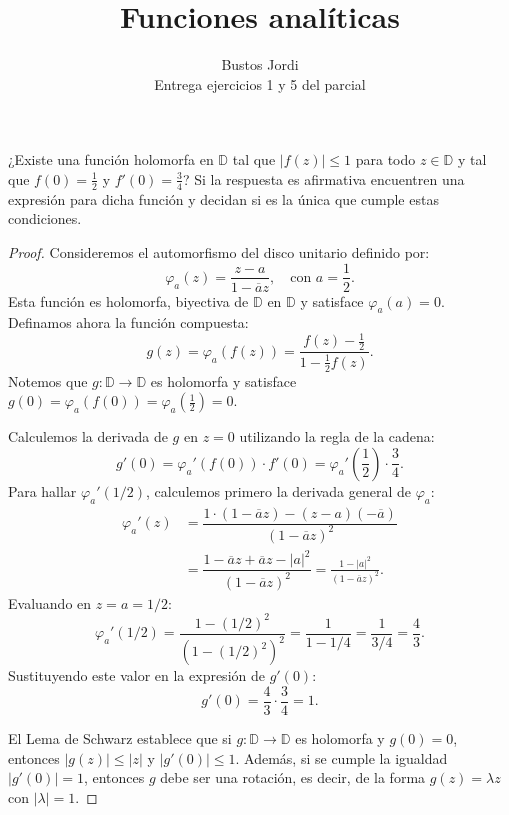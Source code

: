 \documentclass{article}
\newcommand{\D}{\mathbb{D}}
\newenvironment{theorem}[2][Ejercicio]{\begin{trivlist}
\item[\hskip\labelsep{\bfseries #1}\hskip\labelsep{\bfseries #2.}]}{\end{trivlist}}
\begin{document}
\title{Funciones analíticas}
\author{Bustos Jordi\\Entrega ejercicios 1 y 5 del parcial}

\maketitle

\begin{theorem}{1}
    ¿Existe una función holomorfa en \( \D \) tal que \( |f(z)| \leq 1 \) para todo \( z \in \D \) y tal que \( f(0) = \frac{1}{2} \) y
    \( f'(0) = \frac{3}{4} \)? Si la respuesta es afirmativa encuentren una expresión para dicha función y decidan si es la única que cumple estas condiciones.
\end{theorem}

\begin{proof}
    Consideremos el automorfismo del disco unitario definido por:
    \[
        \varphi_a(z) = \dfrac{z-a}{1 - \overline{a}z}, \quad \text{con } a = \frac{1}{2}.
    \]
    Esta función es holomorfa, biyectiva de \( \D \) en \( \D \) y satisface \( \varphi_a(a) = 0 \). Definamos ahora la función compuesta:
    \[
        g(z) = \varphi_a(f(z)) = \frac{f(z) - \frac{1}{2}}{1 - \frac{1}{2}f(z)}.
    \]
    Notemos que \( g : \D \to \D \) es holomorfa y satisface \( g(0) = \varphi_a(f(0)) = \varphi_a\left(\frac{1}{2}\right) = 0 \).

    Calculemos la derivada de \( g \) en \( z=0 \) utilizando la regla de la cadena:
    \[
        g'(0) = \varphi_a'(f(0)) \cdot f'(0) = \varphi_a'\left(\frac{1}{2}\right) \cdot \frac{3}{4}.
    \]
    Para hallar \( \varphi_a'(1/2) \), calculemos primero la derivada general de \( \varphi_a \):
    \begin{align*}
        \varphi_a'(z) & = \dfrac{ 1 \cdot (1-\overline{a}z) - (z - a) (-\overline{a}) }{{(1 - \overline{a}z)}^2}                                  \\
                      & = \dfrac{1 - \overline{a}z + \overline{a}z - |a|^2}{{(1 - \overline{a}z)}^2} = \frac{1 - |a|^2}{{(1 - \overline{a}z)}^2}.
    \end{align*}
    Evaluando en \( z = a = 1/2 \):
    \[
        \varphi_a'(1/2) = \dfrac{1 - (1/2)^2}{{(1 - (1/2)^2)}^2} = \dfrac{1}{1 - 1/4} = \dfrac{1}{3/4} = \frac{4}{3}.
    \]
    Sustituyendo este valor en la expresión de \( g'(0) \):
    \[
        g'(0) = \frac{4}{3} \cdot \frac{3}{4} = 1.
    \]

    El Lema de Schwarz establece que si \( g : \D \to \D \) es holomorfa y \( g(0) = 0 \), entonces \( |g(z)| \leq |z| \) y \( |g'(0)| \leq 1 \). Además, si se cumple la igualdad \( |g'(0)| = 1 \), entonces \( g \) debe ser una rotación, es decir, de la forma \( g(z) = \lambda z \) con \( |\lambda| = 1 \).


\end{proof}
\end{document}
